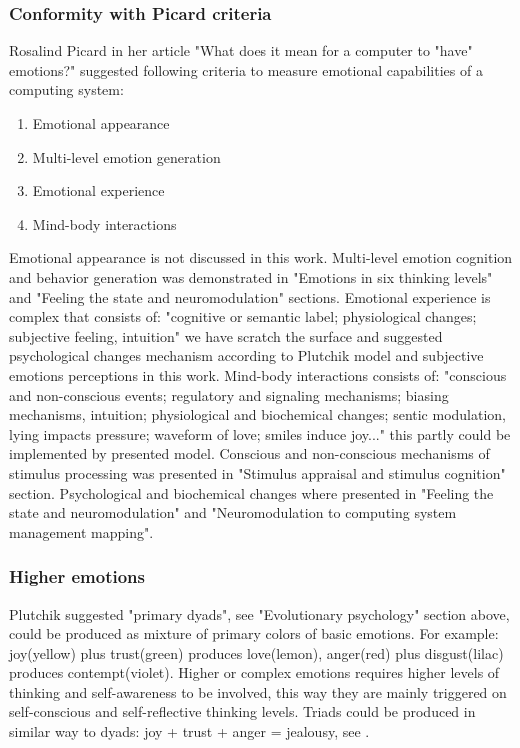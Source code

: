 \subsubsection{Conformity with Picard criteria}

Rosalind Picard in her article "What does it mean for a computer to "have" emotions?" \cite{whatdoesitmeanforcomputer} suggested following criteria to measure emotional capabilities of a computing system:

\begin{enumerate}
\item  Emotional appearance
\item  Multi-level emotion generation
\item  Emotional experience
\item  Mind-body interactions
\end{enumerate}

Emotional appearance is not discussed in this work. Multi-level emotion cognition and behavior generation was demonstrated in "Emotions in six thinking levels" and "Feeling the state and neuromodulation" sections. Emotional experience is complex that consists of: "cognitive or semantic label; physiological changes; subjective feeling, intuition" we have scratch the surface and suggested psychological changes mechanism according to Plutchik model and subjective emotions perceptions in this work. Mind-body interactions consists of: "conscious and non-conscious events; regulatory and signaling mechanisms; biasing mechanisms, intuition; physiological and biochemical changes; sentic modulation, lying impacts pressure; waveform of love; smiles induce joy..." this partly could be implemented by presented model. Conscious and non-conscious mechanisms of stimulus processing was presented in "Stimulus appraisal and stimulus cognition" section. Psychological and biochemical changes where presented in "Feeling the state and neuromodulation" and "Neuromodulation to computing system management mapping".

\subsubsection{Higher emotions}

Plutchik \cite{natureofemotions} suggested "primary dyads", see "Evolutionary psychology" section above, could be produced as mixture of primary colors of basic emotions. For example: joy(yellow) plus trust(green) produces love(lemon), anger(red) plus disgust(lilac) produces contempt(violet). Higher or complex emotions requires higher levels of thinking and self-awareness to be involved, this way they are mainly triggered on self-conscious and self-reflective thinking levels. Triads could be produced in similar way to dyads: joy + trust + anger = jealousy, see \cite{senticcomputing}.

